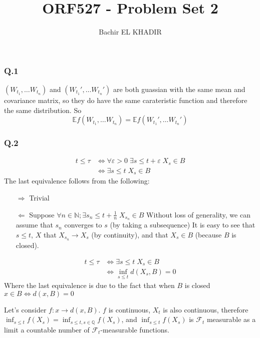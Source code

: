 \documentclass[12pt]{article}
\title{ORF527 - Problem Set 2}
\author{Bachir EL KHADIR }
\newcommand{\Q}[1]{\subsubsection*{Q.#1}}
\begin{document}
\maketitle
\Q{1}
$(W_{t_1}, \ldots W_{t_n})$ and $(W_{t_1}', \ldots W_{t_n}')$ are both guassian with the same mean and covariance matrix, so they do have the same carateristic function and therefore the same distribution.
So $$\mathbb E f(W_{t_1}, \ldots W_{t_n}) = \mathbb E f(W_{t_1}', \ldots W_{t_n}') $$

\Q{2}

\begin{align*}
  t \le \tau &\iff \forall \varepsilon > 0 \; \exists s \le t + \varepsilon \; X_s \in B
  \\&\iff \exists s \le t \; X_s \in B
\end{align*}
The last equivalence follows from the following:
\begin{itemize}
\item[$\Rightarrow$]  Trivial
\item[$\Leftarrow$] Suppose $\forall n \in \mathbb N; \exists s_n \le t + \frac1n \; X_{s_n} \in B$
  Without loss of generality, we can assume that $s_n$ converges to $s$ (by taking a subsequence)
  It is easy to see that $s \le t$, $X$ that $X_{s_n} \rightarrow X_s$ (by continuity), and that $X_s \in B$ (because $B$ is closed).
\end{itemize}
\begin{align*}
  t \le \tau &\iff \exists s \le t \; X_s \in B
  \\&\iff \inf_{s \le t} d(X_s, B) = 0
\end{align*}
Where the last equivalence is due to the fact that when $B$ is closed $x \in B \iff d(x, B) = 0$

Let's consider $f: x \rightarrow d(x, B)$. $f$ is continuous, $X_t$ is also continuous, therefore $\inf_{s \le t} f(X_s) = \inf_{s \le t, s \in \mathbb Q} f(X_s)$, and $\inf_{s \le t} f(X_s)$ is $\mathcal F_t$ measurable as a limit a countable number of $\mathcal F_t$-measurable functions.
\end{document}
